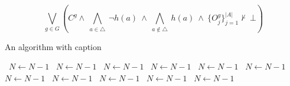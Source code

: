 \documentclass[a4paper]{article}
\begin{document}
\[\bigvee_{g\in G} (C^g \wedge\ \bigwedge_{a\in \triangle}\ \neg h(a)\ \wedge\ \bigwedge_{a\notin \triangle}\ h(a)\ \wedge\ \{O_j^g\}_{j=1}^{|A|} \nvdash\ \bot )\]

\begin{algorithm}
\caption{An algorithm with caption}
\begin{algorithmic}
\    \State $N \gets N - 1$
\    \State $N \gets N - 1$
\    \State $N \gets N - 1$
\    \State $N \gets N - 1$
\    \State $N \gets N - 1$
\    \State $N \gets N - 1$
\    \State $N \gets N - 1$
\    \State $N \gets N - 1$
\    \State $N \gets N - 1$
\    \State $N \gets N - 1$
\    \State $N \gets N - 1$
\EndWhile
\end{algorithmic}
\end{algorithm}
\end{document}
